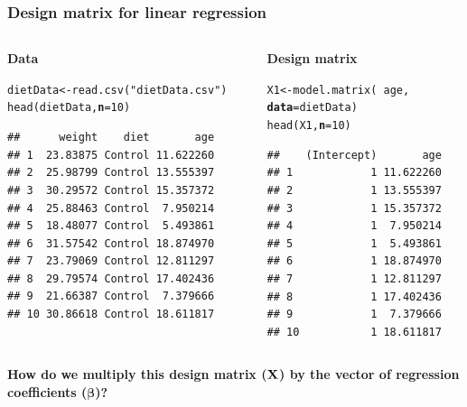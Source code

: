 \documentclass[color=usenames,dvipsnames]{beamer}\usepackage[]{graphicx}\usepackage[]{color}
\makeatletter
\newcommand{\hlnum}[1]{\textcolor[rgb]{0.69,0.494,0}{#1}}%
\newcommand{\hlstr}[1]{\textcolor[rgb]{0.749,0.012,0.012}{#1}}%
\newcommand{\hlopt}[1]{\textcolor[rgb]{0,0,0}{#1}}%
\newcommand{\hlstd}[1]{\textcolor[rgb]{0,0,0}{#1}}%
\newcommand{\hlkwb}[1]{\textcolor[rgb]{0,0.341,0.682}{#1}}%
\newcommand{\hlkwc}[1]{\textcolor[rgb]{0,0,0}{\textbf{#1}}}%
\newcommand{\hlkwd}[1]{\textcolor[rgb]{0.004,0.004,0.506}{#1}}%
\newenvironment{kframe}{%
 \def\at@end@of@kframe{}%
 \ifinner\ifhmode%
  \def\at@end@of@kframe{\end{minipage}}%
  \begin{minipage}{\columnwidth}%
 \fi\fi%
 \def\FrameCommand##1{\hskip\@totalleftmargin \hskip-\fboxsep
 \colorbox{shadecolor}{##1}\hskip-\fboxsep
     \hskip-\linewidth \hskip-\@totalleftmargin \hskip\columnwidth}%
 \MakeFramed {\advance\hsize-\width
   \@totalleftmargin\z@ \linewidth\hsize
   \@setminipage}}%
 {\par\unskip\endMakeFramed%
 \at@end@of@kframe}
\newenvironment{knitrout}{}{} %
\makeatother
\begin{document}
\begin{frame}[fragile]
  \frametitle{Design matrix for linear regression}
  \begin{columns}
    \begin{column}{0.5\textwidth}
    {\bf Data}
      \scriptsize %
\begin{knitrout}\scriptsize
{}\color{fgcolor}\begin{kframe}
\begin{alltt}
\hlstd{dietData} \hlkwb{<-} \hlkwd{read.csv}\hlstd{(}\hlstr{"dietData.csv"}\hlstd{)}
\hlkwd{head}\hlstd{(dietData,} \hlkwc{n}\hlstd{=}\hlnum{10}\hlstd{)}
\end{alltt}
\begin{verbatim}
##      weight    diet       age
## 1  23.83875 Control 11.622260
## 2  25.98799 Control 13.555397
## 3  30.29572 Control 15.357372
## 4  25.88463 Control  7.950214
## 5  18.48077 Control  5.493861
## 6  31.57542 Control 18.874970
## 7  23.79069 Control 12.811297
## 8  29.79574 Control 17.402436
## 9  21.66387 Control  7.379666
## 10 30.86618 Control 18.611817
\end{verbatim}
\end{kframe}
\end{knitrout}
    \end{column}
    \pause
    \begin{column}{0.5\textwidth}
      {\bf Design matrix}
      \scriptsize %
\begin{knitrout}\scriptsize
{}\color{fgcolor}\begin{kframe}
\begin{alltt}
\hlstd{X1} \hlkwb{<-} \hlkwd{model.matrix}\hlstd{(}\hlopt{~}\hlstd{age,}
                   \hlkwc{data}\hlstd{=dietData)}
\hlkwd{head}\hlstd{(X1,} \hlkwc{n}\hlstd{=}\hlnum{10}\hlstd{)}
\end{alltt}
\begin{verbatim}
##    (Intercept)       age
## 1            1 11.622260
## 2            1 13.555397
## 3            1 15.357372
## 4            1  7.950214
## 5            1  5.493861
## 6            1 18.874970
## 7            1 12.811297
## 8            1 17.402436
## 9            1  7.379666
## 10           1 18.611817
\end{verbatim}
\end{kframe}
\end{knitrout}
    \end{column}
  \end{columns}
  \pause
  \vfill
  {\centering \bf How do we multiply this design matrix ($\bf X$) by
    the vector of regression coefficients ($\bm \beta$)? \par}
\end{frame}
\end{document}

